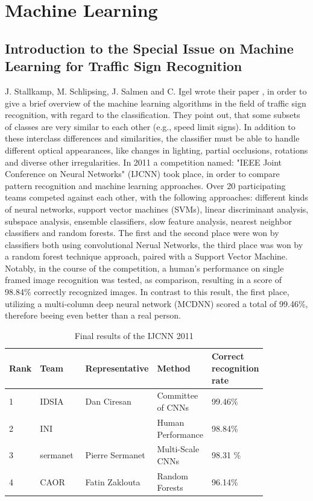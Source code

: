 \section{Machine Learning}
\subsection{Introduction to the Special Issue on Machine Learning for Traffic Sign Recognition}

J. Stallkamp, M. Schlipsing, J. Salmen and C. Igel wrote their paper \cite{machinelearning}, in order to give a brief overview of the machine learning algorithms in the field of traffic sign recognition, with regard to the classification. \newline
They point out, that some subsets of classes are
very similar to each other (e.g., speed limit signs). In addition to these interclass differences and similarities, the classifier must be able to handle different optical appearances, like changes in lighting, partial occlusions, rotations and diverse other irregularities. In 2011 a competition named: "IEEE Joint
Conference on Neural Networks" (IJCNN) \cite{ijcnn} took place, in order to compare pattern recognition and machine learning approaches. Over 20 participating teams competed against each other, with the following approaches: different kinds of neural
networks, support vector machines (SVMs), linear discriminant analysis, subspace analysis, ensemble classifiers, slow feature analysis, nearest neighbor classifiers and random forests. \newline
The first and the second place were won by classifiers both using convolutional Nerual Networks, the third place was won by a random forest technique approach, paired with a Support Vector Machine. Notably, in the course of the competition, a human's performance on single framed image recognition was tested, as comparison, resulting in a score of 98.84\% correctly recognized images. In contrast to this result, the first place, utilizing a multi-column deep neural network (MCDNN) scored a total of 99.46\%, therefore beeing even better than a real person. 

\begin{table}[h]
	\begin{tabular}{||p{0.05\linewidth} | p{0.2\linewidth}|p{0.2\linewidth}|p{0.2\linewidth}|p{0.2\linewidth}||}
		\hline
		Rank  &	Team & Representative &	Method &	Correct recognition rate\\
		\hline
		\hline
		1 & IDSIA & Dan Ciresan & Committee of CNNs &	99.46\% \\
		\hline
		2 &	INI & & Human Performance & 98.84\% \\
		\hline
		3 & sermanet & Pierre Sermanet & Multi-Scale CNNs & 98.31 \% \\
		\hline
		4 & CAOR & Fatin Zaklouta & Random Forests &	96.14\% \\
		\hline
		
	\end{tabular}
	\caption{Final results of the IJCNN 2011}
	\label{table:icjnn2011}
	
\end{table}


